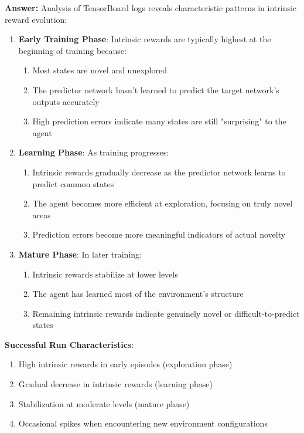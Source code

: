 \documentclass[12pt]{article}
\begin{document}
{{{\textbf{Answer:} Analysis of TensorBoard logs reveals characteristic patterns in intrinsic reward evolution:

\begin{enumerate}
    \item \textbf{Early Training Phase}: Intrinsic rewards are typically highest at the beginning of training because:
    \begin{enumerate}
        \item Most states are novel and unexplored
        \item The predictor network hasn't learned to predict the target network's outputs accurately
        \item High prediction errors indicate many states are still "surprising" to the agent
    \end{enumerate}
    
    \item \textbf{Learning Phase}: As training progresses:
    \begin{enumerate}
        \item Intrinsic rewards gradually decrease as the predictor network learns to predict common states
        \item The agent becomes more efficient at exploration, focusing on truly novel areas
        \item Prediction errors become more meaningful indicators of actual novelty
    \end{enumerate}
    
    \item \textbf{Mature Phase}: In later training:
    \begin{enumerate}
        \item Intrinsic rewards stabilize at lower levels
        \item The agent has learned most of the environment's structure
        \item Remaining intrinsic rewards indicate genuinely novel or difficult-to-predict states
    \end{enumerate}
\end{enumerate}

\textbf{Successful Run Characteristics}:
\begin{enumerate}
    \item High intrinsic rewards in early episodes (exploration phase)
    \item Gradual decrease in intrinsic rewards (learning phase)
    \item Stabilization at moderate levels (mature phase)
    \item Occasional spikes when encountering new environment configurations
\end{enumerate}

}}}
\end{document}
